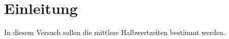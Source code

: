 \section{Einleitung}
In diesem Versuch sollen die mittlere Halbwertzeiten bestimmt werden.
\label{sec:Einleitung}